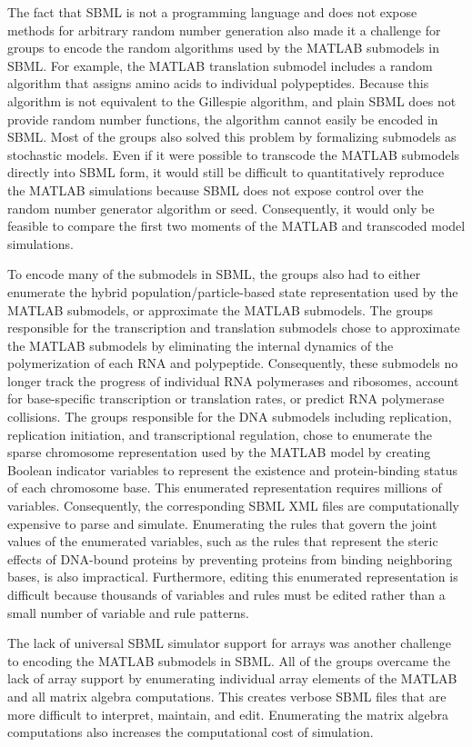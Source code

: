 \documentclass[journal,transmag]{IEEEtran}
\begin{document}
The fact that SBML is not a programming language and does not expose methods for arbitrary random number generation also made it a challenge for groups to encode the random algorithms used by the MATLAB submodels in SBML. For example, the MATLAB translation submodel includes a random algorithm that assigns amino acids to individual polypeptides. Because this algorithm is not equivalent to the Gillespie algorithm, and plain SBML does not provide random number functions, the algorithm cannot easily be encoded in SBML. Most of the groups also solved this problem by formalizing submodels as stochastic models. Even if it were possible to transcode the MATLAB submodels directly into SBML form, it would still be difficult to quantitatively reproduce the MATLAB simulations because SBML does not expose control over the random number generator algorithm or seed. Consequently, it would only be feasible to compare the first two moments of the MATLAB and transcoded model simulations.

To encode many of the submodels in SBML, the groups also had to either enumerate the hybrid population/particle-based state representation used by the MATLAB submodels, or approximate the MATLAB submodels. The groups responsible for the transcription and translation submodels chose to approximate the MATLAB submodels by eliminating the internal dynamics of the polymerization of each RNA and polypeptide. Consequently, these submodels no longer track the progress of individual RNA polymerases and ribosomes, account for base-specific transcription or translation rates, or predict RNA polymerase collisions. The groups responsible for the DNA submodels including replication, replication initiation, and transcriptional regulation, chose to enumerate the sparse chromosome representation used by the MATLAB model by creating Boolean indicator variables to represent the existence and protein-binding status of each chromosome base. This enumerated representation requires millions of variables. Consequently, the corresponding SBML XML files are computationally expensive to parse and simulate. Enumerating the rules that govern the joint values of the enumerated variables, such as the rules that represent the steric effects of DNA-bound proteins by preventing proteins from binding neighboring bases, is also impractical. Furthermore, editing this enumerated representation is difficult because thousands of variables and rules must be edited rather than a small number of variable and rule patterns.

The lack of universal SBML simulator support for arrays was another challenge to encoding the MATLAB submodels in SBML. All of the groups overcame the lack of array support by enumerating individual array elements of the MATLAB and all matrix algebra computations. This creates verbose SBML files that are more difficult to interpret, maintain, and edit. Enumerating the matrix algebra computations also increases the computational cost of simulation.
\end{document}
